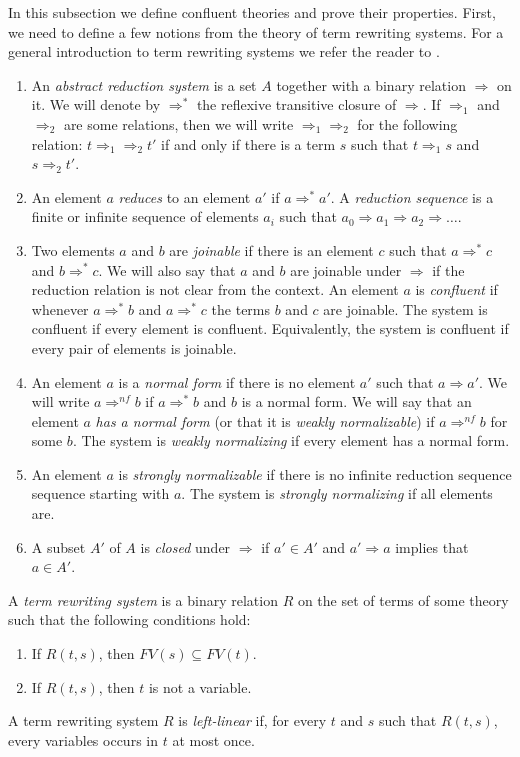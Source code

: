 \documentclass[reqno]{amsart}
\theoremstyle{definition}
\theoremstyle{remark}
\numberwithin{figure}{section}
\begin{document}
In this subsection we define confluent theories and prove their properties.
First, we need to define a few notions from the theory of term rewriting systems.
For a general introduction to term rewriting systems we refer the reader to \cite{Terese,klop-trs,ohlebusch-advanced}.
\begin{enumerate}
\item An \emph{abstract reduction system} is a set $A$ together with a binary relation $\Rightarrow$ on it.
We will denote by $\Rightarrow^*$ the reflexive transitive closure of $\Rightarrow$.
If $\Rightarrow_1$ and $\Rightarrow_2$ are some relations, then we will write $\Rightarrow_1 \Rightarrow_2$ for the following relation:
$t \Rightarrow_1 \Rightarrow_2 t'$ if and only if there is a term $s$ such that $t \Rightarrow_1 s$ and $s \Rightarrow_2 t'$.
\item An element $a$ \emph{reduces} to an element $a'$ if $a \Rightarrow^* a'$.
A \emph{reduction sequence} is a finite or infinite sequence of elements $a_i$ such that $a_0 \Rightarrow a_1 \Rightarrow a_2 \Rightarrow \ldots$.
\item Two elements $a$ and $b$ are \emph{joinable} if there is an element $c$ such that $a \Rightarrow^* c$ and $b \Rightarrow^* c$.
We will also say that $a$ and $b$ are joinable under $\Rightarrow$ if the reduction relation is not clear from the context.
An element $a$ is \emph{confluent} if whenever $a \Rightarrow^* b$ and $a \Rightarrow^* c$ the terms $b$ and $c$ are joinable.
The system is confluent if every element is confluent.
Equivalently, the system is confluent if every pair of elements is joinable.
\item An element $a$ is a \emph{normal form} if there is no element $a'$ such that $a \Rightarrow a'$.
We will write $a \Rightarrow^{nf} b$ if $a \Rightarrow^* b$ and $b$ is a normal form.
We will say that an element $a$ \emph{has a normal form} (or that it is \emph{weakly normalizable}) if $a \Rightarrow^{nf} b$ for some $b$.
The system is \emph{weakly normalizing} if every element has a normal form.
\item An element $a$ is \emph{strongly normalizable} if there is no infinite reduction sequence sequence starting with $a$.
The system is \emph{strongly normalizing} if all elements are.
\item A subset $A'$ of $A$ is \emph{closed} under $\Rightarrow$ if $a' \in A'$ and $a' \Rightarrow a$ implies that $a \in A'$.
\end{enumerate}

A \emph{term rewriting system} is a binary relation $R$ on the set of terms of some theory such that the following conditions hold:
\begin{enumerate}
\item If $R(t,s)$, then $FV(s) \subseteq FV(t)$.
\item If $R(t,s)$, then $t$ is not a variable.
\end{enumerate}
A term rewriting system $R$ is \emph{left-linear} if, for every $t$ and $s$ such that $R(t,s)$, every variables occurs in $t$ at most once.
\end{document}
